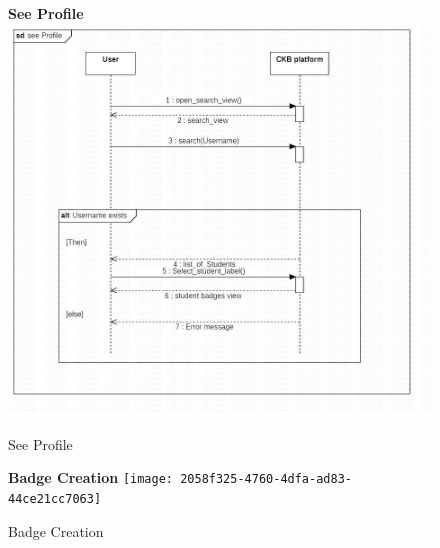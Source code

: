\begin{enumerate}[label=\textbf{[UC\arabic*]}]
\begin{enumerate}[label=\textbf{[UC\arabic*]}]
    \begin{figure}
    \item \textbf{See Profile}
        \centering
        \includegraphics[width= \textwidth]{Images/WhatsApp Image 2023-12-20 at 18.34.43_e728ecf8.jpg}
        \caption{See Profile}
        \label{fig:enter-label}
    \end{figure}

    \begin{figure}
    \item \textbf{Badge Creation}
        \centering
        \texttt{[image: 2058f325-4760-4dfa-ad83-44ce21cc7063]}
        \caption{Badge Creation}
        \label{fig:enter-label}
    \end{figure}

    

    
    
\end{enumerate}








\pagebreak[4]
\newpage


\end{enumerate}
